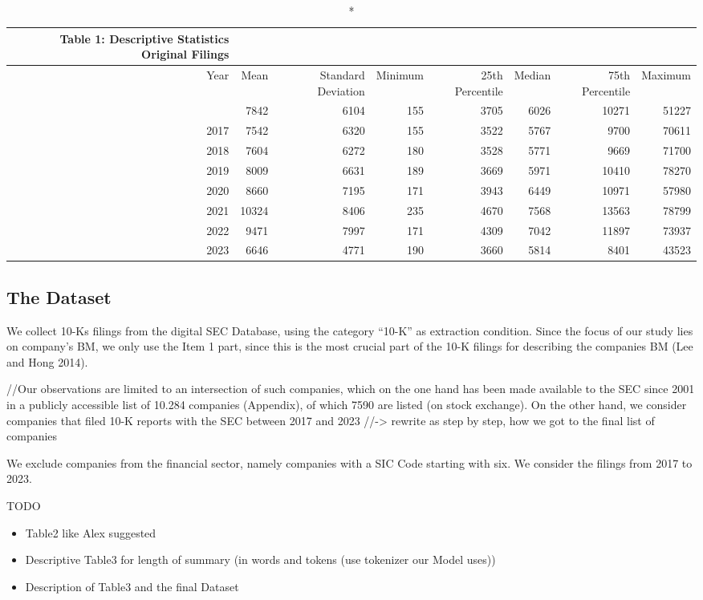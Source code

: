 \documentclass[
]{article}
\providecommand{\tightlist}{%
  \setlength{\itemsep}{0pt}\setlength{\parskip}{0pt}}\usepackage{longtable,booktabs,array}
\begin{document}
\begin{longtable*}{rrrrrrrr}
\caption*{
{\large Table 1: Descriptive Statistics Original Filings}
} \\ 
\toprule
Year & Mean & Standard Deviation & Minimum & 25th Percentile & Median & 75th Percentile & Maximum \\ 
\midrule{} & 7842 & 6104 & 155 & 3705 & 6026 & 10271 & 51227 \\ 
2017 & 7542 & 6320 & 155 & 3522 & 5767 & 9700 & 70611 \\ 
2018 & 7604 & 6272 & 180 & 3528 & 5771 & 9669 & 71700 \\ 
2019 & 8009 & 6631 & 189 & 3669 & 5971 & 10410 & 78270 \\ 
2020 & 8660 & 7195 & 171 & 3943 & 6449 & 10971 & 57980 \\ 
2021 & 10324 & 8406 & 235 & 4670 & 7568 & 13563 & 78799 \\ 
2022 & 9471 & 7997 & 171 & 4309 & 7042 & 11897 & 73937 \\ 
2023 & 6646 & 4771 & 190 & 3660 & 5814 & 8401 & 43523 \\ 
\bottomrule
\end{longtable*}

\subsection{The Dataset}\label{the-dataset}

We collect 10-Ks filings from the digital SEC Database, using the
category ``10-K'' as extraction condition. Since the focus of our study
lies on company's BM, we only use the Item 1 part, since this is the
most crucial part of the 10-K filings for describing the companies BM
(Lee and Hong 2014).

//Our observations are limited to an intersection of such companies,
which on the one hand has been made available to the SEC since 2001 in a
publicly accessible list of 10.284 companies (Appendix), of which 7590
are listed (on stock exchange). On the other hand, we consider companies
that filed 10-K reports with the SEC between 2017 and 2023
//-\textgreater{} rewrite as step by step, how we got to the final list
of companies

We exclude companies from the financial sector, namely companies with a
SIC Code starting with six. We consider the filings from 2017 to 2023.

TODO

\begin{itemize}
\tightlist
\item
  Table2 like Alex suggested
\item
  Descriptive Table3 for length of summary (in words and tokens (use
  tokenizer our Model uses))
\item
  Description of Table3 and the final Dataset
\end{itemize}
\end{document}
